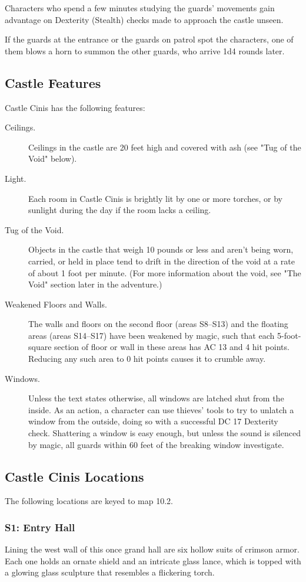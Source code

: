 \documentclass[10pt,a4paper,twoside,bg=print,twocolumn,openany,nodeprecatedcode]{dndbook}
\begin{document}
Characters who spend a few minutes studying the guards' movements gain advantage on Dexterity (Stealth) checks made to approach the castle unseen.

If the guards at the entrance or the guards on patrol spot the characters, one of them blows a horn to summon the other guards, who arrive 1d4 rounds later.

\subsection{Castle Features}
Castle Cinis has the following features:


\begin{description}
\item[Ceilings.]
Ceilings in the castle are 20 feet high and covered with ash (see "Tug of the Void" below).
\item[Light.]
Each room in Castle Cinis is brightly lit by one or more torches, or by sunlight during the day if the room lacks a ceiling.
\item[Tug of the Void.]
Objects in the castle that weigh 10 pounds or less and aren't being worn, carried, or held in place tend to drift in the direction of the void at a rate of about 1 foot per minute. (For more information about the void, see "The Void" section later in the adventure.)
\item[Weakened Floors and Walls.]
The walls and floors on the second floor (areas S8–S13) and the floating areas (areas S14–S17) have been weakened by magic, such that each 5-foot-square section of floor or wall in these areas has AC 13 and 4 hit points. Reducing any such area to 0 hit points causes it to crumble away.
\item[Windows.]
Unless the text states otherwise, all windows are latched shut from the inside. As an action, a character can use thieves' tools to try to unlatch a window from the outside, doing so with a successful DC 17 Dexterity check. Shattering a window is easy enough, but unless the sound is silenced by magic, all guards within 60 feet of the breaking window investigate.
\end{description}

\subsection{Castle Cinis Locations}
The following locations are keyed to map 10.2.

\subsubsection{S1: Entry Hall}
\begin{DndReadAloud}{}
Lining the west wall of this once grand hall are six hollow suits of crimson armor. Each one holds an ornate shield and an intricate glass lance, which is topped with a glowing glass sculpture that resembles a flickering torch.

\end{DndReadAloud}
\end{document}

